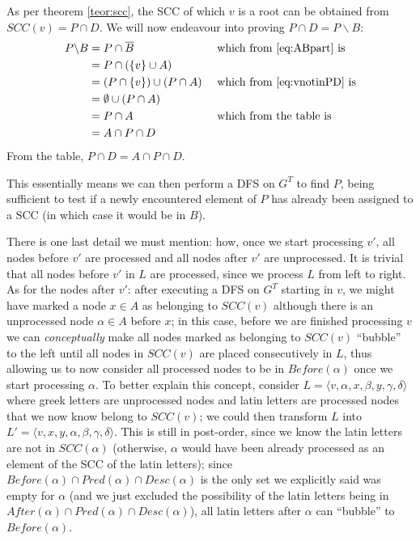 As per theorem \ref{teor:scc}, the \acrshort*{SCC} of which $v$ is a root can be obtained from $SCC(v)=P \cap D$. We will now endeavour into proving $P \cap D = P \backslash B$:
\begin{alignat*}{2}
    P \backslash B &= P \cap \overline{B}&&\text{ which from \eqref{eq:ABpart} is} \\
                   &= P \cap (\{v\} \cup A) && \\
                   &= (P \cap \{v\}) \cup (P \cap A)&&\text{ which from \eqref{eq:vnotinPD} is}\\
                   &= \emptyset \cup (P \cap A)&&\\
                   &= P \cap A &&\text{ which from the table is }\\
                   &= A \cap P \cap D &&
\end{alignat*}
From the table, $P \cap D = A \cap P \cap D$.\par
This essentially means we can then perform a \acrshort*{DFS} on $G^T$ to find $P$, being sufficient to test if a newly encountered element of $P$ has already been assigned to a \acrshort*{SCC} (in which case it would be in $B$).\par
There is one last detail we must mention: how, once we start processing $v'$, all nodes before $v'$ are processed and all nodes after $v'$ are unprocessed. It is trivial that all nodes before $v'$ in $L$ are processed, since we process $L$ from left to right. As for the nodes after $v'$: after executing a \acrshort*{DFS} on $G^T$ starting in $v$, we might have marked a node $x \in A$ as belonging to $SCC(v)$ although there is an unprocessed node $\alpha \in A$ before $x$; in this case, before we are finished processing $v$ we can \emph{conceptually} make all nodes marked as belonging to $SCC(v)$ ``bubble'' to the left until all nodes in $SCC(v)$ are placed consecutively in $L$, thus allowing us to now consider all processed nodes to be in $Before(\alpha)$ once we start processing $\alpha$. To better explain this concept, consider $L=\langle v, \alpha, x, \beta, y, \gamma, \delta \rangle $ where greek letters are unprocessed nodes and latin letters are processed nodes that we now know belong to $SCC(v)$; we could then transform $L$ into $L'=\langle v, x, y, \alpha, \beta, \gamma, \delta \rangle$. This is still in post-order, since we know the latin letters are not in $SCC(\alpha)$ (otherwise, $\alpha$ would have been already processed as an element of the \acrshort*{SCC} of the latin letters); since $Before(\alpha) \cap Pred(\alpha) \cap Desc(\alpha)$ is the only set we explicitly said was empty for $\alpha$ (and we just excluded the possibility of the latin letters being in $After(\alpha) \cap Pred(\alpha) \cap Desc(\alpha)$), all latin letters after $\alpha$ can ``bubble'' to $Before(\alpha)$.\par
